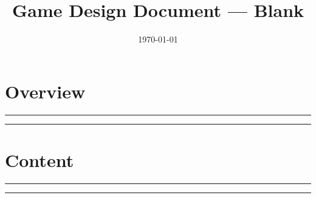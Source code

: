 \documentclass[11pt]{article}
\title{Game Design Document --- Blank}
\author{}
\date{\today}
\begin{document}
\maketitle

\section{Overview}
\noindent\rule{0.85\linewidth}{0.4pt}\par\vspace{2em}\noindent\rule{0.85\linewidth}{0.4pt}

\section{Content}
\noindent\rule{0.85\linewidth}{0.4pt}\par\vspace{2em}\noindent\rule{0.85\linewidth}{0.4pt}
\end{document}
